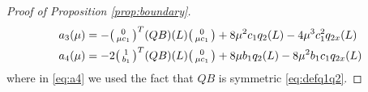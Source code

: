\documentclass[11pt]{article}
\begin{document}
\begin{proof}[Proof of Proposition \ref{prop:boundary}]
\begin{align}
    a_3(\mu) &= -\begin{psmallmatrix}0 \\ \mu c_1\end{psmallmatrix}^T (QB)(L) \begin{psmallmatrix}0 \\ \mu c_1\end{psmallmatrix} + 8 \mu^2 c_1 q_2(L) - 4 \mu^3 c_1^2 q_{2x}(L) \\
    a_4(\mu) &= -2 \begin{psmallmatrix} 1 \\ b_1 \end{psmallmatrix}^T (QB)(L) \begin{psmallmatrix}0 \\ \mu c_1\end{psmallmatrix} + 8 \mu b_1q_2(L) - 8 \mu^2 b_1 c_1 q_{2x}(L) \label{eq:a4}
\end{align}
where in \eqref{eq:a4} we used the fact that $QB$ is symmetric \eqref{eq:defq1q2}.


\end{proof}
\end{document}
